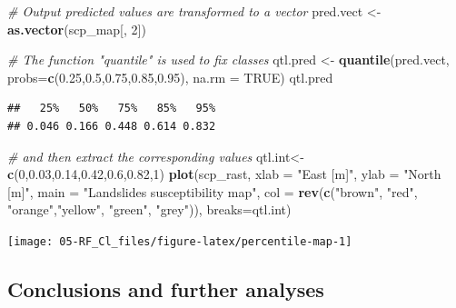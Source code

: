 \documentclass[
]{article}
\newenvironment{Shaded}{\begin{snugshade}}{\end{snugshade}}
\newcommand{\AttributeTok}[1]{\textcolor[rgb]{0.13,0.29,0.53}{#1}}
\newcommand{\CommentTok}[1]{\textcolor[rgb]{0.56,0.35,0.01}{\textit{#1}}}
\newcommand{\ConstantTok}[1]{\textcolor[rgb]{0.56,0.35,0.01}{#1}}
\newcommand{\DecValTok}[1]{\textcolor[rgb]{0.00,0.00,0.81}{#1}}
\newcommand{\FloatTok}[1]{\textcolor[rgb]{0.00,0.00,0.81}{#1}}
\newcommand{\FunctionTok}[1]{\textcolor[rgb]{0.13,0.29,0.53}{\textbf{#1}}}
\newcommand{\NormalTok}[1]{#1}
\newcommand{\OtherTok}[1]{\textcolor[rgb]{0.56,0.35,0.01}{#1}}
\newcommand{\StringTok}[1]{\textcolor[rgb]{0.31,0.60,0.02}{#1}}
\begin{document}
\begin{Shaded}
\begin{Highlighting}[]
\CommentTok{\# Output predicted values are transformed to a vector}
\NormalTok{pred.vect }\OtherTok{\textless{}{-}} \FunctionTok{as.vector}\NormalTok{(scp\_map[, }\DecValTok{2}\NormalTok{])}

\CommentTok{\# The function "quantile" is used to fix classes}
\NormalTok{qtl.pred }\OtherTok{\textless{}{-}} \FunctionTok{quantile}\NormalTok{(pred.vect, }\AttributeTok{probs=}\FunctionTok{c}\NormalTok{(}\FloatTok{0.25}\NormalTok{,}\FloatTok{0.5}\NormalTok{,}\FloatTok{0.75}\NormalTok{,}\FloatTok{0.85}\NormalTok{,}\FloatTok{0.95}\NormalTok{), }\AttributeTok{na.rm =} \ConstantTok{TRUE}\NormalTok{)}
\NormalTok{qtl.pred}
\end{Highlighting}
\end{Shaded}

\begin{verbatim}
##   25%   50%   75%   85%   95% 
## 0.046 0.166 0.448 0.614 0.832
\end{verbatim}

\begin{Shaded}
\begin{Highlighting}[]
\CommentTok{\# and then extract the corresponding values}
\NormalTok{qtl.int}\OtherTok{\textless{}{-}} \FunctionTok{c}\NormalTok{(}\DecValTok{0}\NormalTok{,}\FloatTok{0.03}\NormalTok{,}\FloatTok{0.14}\NormalTok{,}\FloatTok{0.42}\NormalTok{,}\FloatTok{0.6}\NormalTok{,}\FloatTok{0.82}\NormalTok{,}\DecValTok{1}\NormalTok{)}
\FunctionTok{plot}\NormalTok{(scp\_rast, }\AttributeTok{xlab =} \StringTok{"East [m]"}\NormalTok{, }\AttributeTok{ylab =} \StringTok{"North [m]"}\NormalTok{, }
     \AttributeTok{main =} \StringTok{"Landslides susceptibility map"}\NormalTok{, }
     \AttributeTok{col =} \FunctionTok{rev}\NormalTok{(}\FunctionTok{c}\NormalTok{(}\StringTok{"brown"}\NormalTok{, }\StringTok{"red"}\NormalTok{, }\StringTok{"orange"}\NormalTok{,}\StringTok{"yellow"}\NormalTok{, }\StringTok{"green"}\NormalTok{, }\StringTok{"grey"}\NormalTok{)), }\AttributeTok{breaks=}\NormalTok{qtl.int)}
\end{Highlighting}
\end{Shaded}

\begin{center}\texttt{[image: 05-RF\_Cl\_files/figure-latex/percentile-map-1]} \end{center}

\subsection{Conclusions and further analyses}\label{conclusions-and-further-analyses-2}
\end{document}
